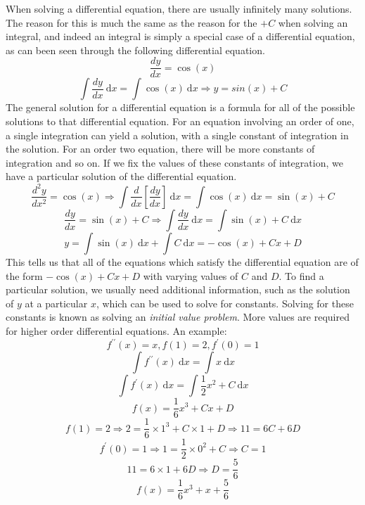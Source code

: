 \documentclass[12pt]{report}
\newcommand{\dx}{\:\mathrm{d}x}
\begin{document}
\begin{flushleft}
\bigskip
When solving a differential equation, there are usually infinitely many 
solutions. The reason for this is much the same as the reason for the \(+C\)
when solving an integral, and indeed an integral is simply a special case of
a differential equation, as can been seen through the following differential
equation.
\[\frac{dy}{dx} = \cos(x)\]
\[\int \frac{dy}{dx} \dx = \int \cos(x) \dx \Rightarrow y = sin(x) + C\]
The general solution for a differential equation is a formula for all of the
possible solutions to that differential equation. For an equation involving
an order of one, a single integration can yield a solution, with a single
constant of integration in the solution. For an order two equation, there will
be more constants of integration and so on. If we fix the values of these 
constants of integration, we have a particular solution of the differential
equation.
\[\frac{d^2y}{dx^2} = \cos(x) \Rightarrow 
\int \frac{d}{dx}\left[\frac{dy}{dx}\right] \dx 
= \int \cos(x) \dx = \sin(x) + C\]
\[\frac{dy}{dx} = \sin(x) + C \Rightarrow \int \frac{dy}{dx} \dx  
= \int \sin(x) + C \dx\]
\[y = \int\sin(x) \dx + \int C \dx = -\cos(x) + Cx + D\]
This tells us that all of the equations which satisfy the differential equation
are of the form \(-\cos(x) + Cx + D\) with varying values of \(C\) and \(D\).
To find a particular solution, we usually need additional information, such as
the solution of \(y\) at a particular \(x\), which can be used to solve for
constants. Solving for these constants is known as solving an \textit{initial 
value problem}. More values are required for higher order differential 
equations. An example:
\[f^{\prime\prime}(x) = x, f(1) = 2, f^\prime(0) = 1\]
\[\int f^{\prime\prime}(x) \dx = \int x \dx\]
\[\int f^\prime(x) \dx = \int \frac{1}{2}x^2 + C \dx\]
\[f(x) = \frac{1}{6}x^3 + Cx + D\]
\[f(1) = 2 \Rightarrow 2 = \frac{1}{6}\times1^3 + C\times1 + D 
\Rightarrow 11 = 6C + 6D\]
\[f^\prime(0) = 1 \Rightarrow 1 = \frac{1}{2}\times0^2 + C \Rightarrow C = 1\]
\[11 = 6\times1 + 6D \Rightarrow D = \frac{5}{6}\]
\[f(x) = \frac{1}{6}x^3 + x + \frac{5}{6}\]


\end{flushleft}
\end{document}
